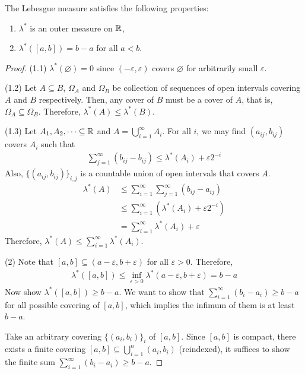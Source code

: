\documentclass[11pt]{article}
\begin{document}
	\begin{proposition}
		The Lebesgue measure satisfies the following properties:
		\begin{enumerate}
			\item $\lambda^*$ is an outer measure on $\mathbb{R}$,
			\item $\lambda^*([a, b]) = b - a$ for all $a < b$.
		\end{enumerate}
		\begin{proof}
			(1.1) $\lambda^*(\varnothing) = 0$ since $(-\varepsilon, \varepsilon)$ covers $\varnothing$ for arbitrarily small $\varepsilon$.
			
			(1.2) Let $A \subseteq B$, $\Omega_A$ and $\Omega_B$ be collection of sequences of open intervals covering $A$ and $B$ respectively.
			Then, any cover of $B$ must be a cover of $A$, that is, $\Omega_A \subseteq \Omega_B$.
			Therefore, $\lambda^*(A) \leq \lambda^*(B)$.
			
			(1.3) Let $A_1, A_2, \dots \subseteq \mathbb{R}$ and $A = \bigcup_{i=1}^\infty A_i$. For all $i$, we may find $(a_{ij}, b_{ij})$ covers $A_i$ such that
			\begin{align}
				\sum_{j=1}^\infty (b_{ij} - b_{ij}) \leq  \lambda^*(A_i) + \varepsilon 2^{-i}
			\end{align}
			Also, $\{(a_{ij}, b_{ij})\}_{i,j}$ is a countable union of open intervals that covers $A$.
			\begin{align}
				\lambda^*(A) &\leq \sum_{i=1}^\infty \sum_{j=1}^\infty (b_{ij} - a_{ij}) \\
				&\leq \sum_{i=1}^\infty (\lambda^*(A_i) + \varepsilon 2^{-i}) \\
				&=\sum_{i=1}^\infty \lambda^*(A_i) + \varepsilon
			\end{align}
			Therefore, $\lambda^*(A) \leq \sum_{i=1}^\infty \lambda^*(A_i)$.
			
			(2) Note that $[a, b] \subseteq (a-\varepsilon, b+\varepsilon)$ for all $\varepsilon > 0$.
			Therefore,
			\begin{align}
				\lambda^*([a, b]) \leq \inf_{\varepsilon > 0} \lambda^*(a-\varepsilon, b+\varepsilon) = b - a
			\end{align}
			Now show $\lambda^*([a, b]) \geq b - a$.
			We want to show that $\sum_{i=1}^\infty (b_i - a_i) \geq b - a$ for all possible covering of $[a, b]$, which implies the infimum of them is at least $b - a$.
			
			Take an arbitrary covering $\{(a_i, b_i)\}_i$ of $[a, b]$.
			Since $[a, b]$ is compact, there exists a finite covering $[a, b] \subseteq \bigcup_{i=1}^n (a_i, b_i)$ (reindexed), it suffices to show the finite sum $\sum_{i=1}^\infty (b_i - a_i) \geq b - a$.
			

\end{proof}
\end{proposition}
\end{document}

